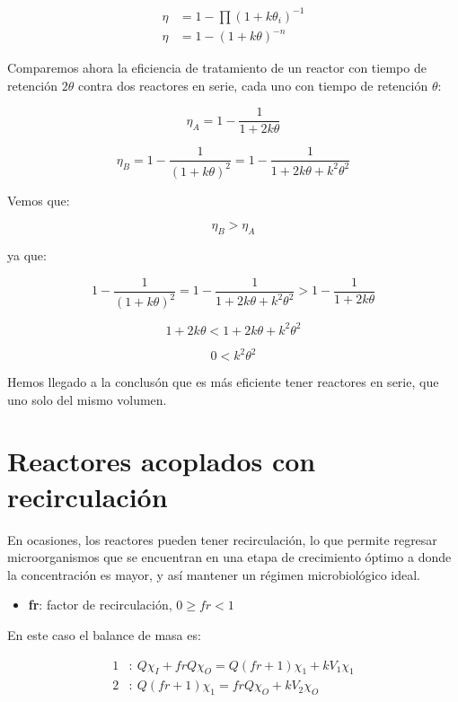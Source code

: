 \documentclass[11pt]{article}
\begin{document}
\[ \boxed{ \begin{aligned}
    \eta & = 1 - \prod \left( 1 + k \theta_i \right) ^ {-1} \\
    \eta & = 1 - \left( 1 + k \theta \right) ^ {-n}
\end{aligned} } \]

Comparemos ahora la eficiencia de tratamiento de un reactor con tiempo de retención \( 2 \theta \) contra dos reactores en serie, cada uno con tiempo de retención \( \theta \): 

\[ \eta_A = 1 - \frac{1}{ 1 + 2 k \theta } \]

\[ \eta_B = 1 - \frac{1}{ \left( 1 + k \theta \right) ^ 2 } = 1 - \frac{1}{ 1 + 2 k \theta + k ^ 2 \theta ^ 2 } \]

Vemos que:

\[ \eta_B > \eta_A \]

ya que:

\[ 1 - \frac{1}{ \left( 1 + k \theta \right) ^ 2 } = 1 - \frac{1}{ 1 + 2 k \theta + k ^ 2 \theta ^ 2 } > 1 - \frac{1}{ 1 + 2 k \theta } \]

\[ 1 + 2 k \theta < 1 + 2 k \theta + k ^ 2 \theta ^ 2 \]

\[ 0 < k ^ 2 \theta ^ 2 \]

Hemos llegado a la conclusón que es más eficiente tener reactores en serie, que uno solo del mismo volumen.

\section{Reactores acoplados con recirculación}

En ocasiones, los reactores pueden tener recirculación, lo que permite regresar microorganismos que se encuentran en una etapa de crecimiento óptimo a donde la concentración es mayor, y así mantener un régimen microbiológico ideal.

\begin{itemize}
    \item \textbf{fr}: factor de recirculación, \( 0 \geq fr < 1 \)
\end{itemize}

En este caso el balance de masa es: 

\[ \begin{aligned}
    1 & : \ Q \chi_I + fr Q \chi_O = Q \left( fr + 1 \right) \chi_1 + k V_1 \chi_1 \\
    2 & : \ Q \left( fr + 1 \right) \chi_1 = fr Q \chi_O + k V_2 \chi_O
\end{aligned} \]
\end{document}
